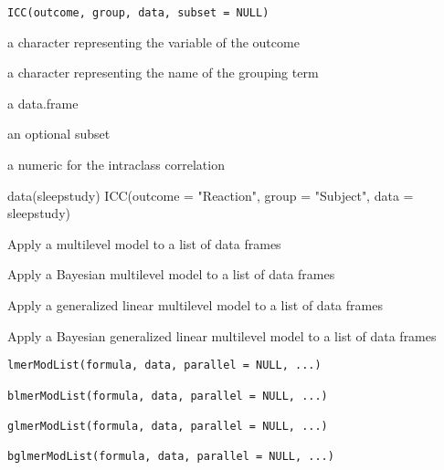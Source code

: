 \documentclass[letterpaper]{book}
\begin{document}
%
\begin{Usage}
\begin{verbatim}
ICC(outcome, group, data, subset = NULL)
\end{verbatim}
\end{Usage}
%
\begin{Arguments}
\begin{ldescription}
\item[\code{outcome}] a character representing the variable of the outcome

\item[\code{group}] a character representing the name of the grouping term

\item[\code{data}] a data.frame

\item[\code{subset}] an optional subset
\end{ldescription}
\end{Arguments}
%
\begin{Value}
a numeric for the intraclass correlation
\end{Value}
%
\begin{Examples}
\begin{ExampleCode}
data(sleepstudy)
ICC(outcome = "Reaction", group = "Subject", data = sleepstudy)
\end{ExampleCode}
\end{Examples}
%
\begin{Description}\relax
Apply a multilevel model to a list of data frames

Apply a Bayesian multilevel model to a list of data frames

Apply a generalized linear multilevel model to a list of data frames

Apply a Bayesian generalized linear multilevel model to a list of data frames
\end{Description}
%
\begin{Usage}
\begin{verbatim}
lmerModList(formula, data, parallel = NULL, ...)

blmerModList(formula, data, parallel = NULL, ...)

glmerModList(formula, data, parallel = NULL, ...)

bglmerModList(formula, data, parallel = NULL, ...)
\end{verbatim}
\end{Usage}
\end{document}
